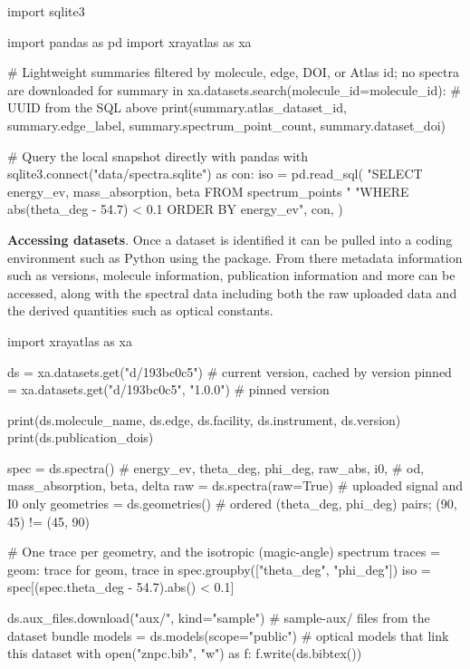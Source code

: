\begin{codeblock}
import sqlite3

import pandas as pd
import xrayatlas as xa

# Lightweight summaries filtered by molecule, edge, DOI, or Atlas id; no spectra are downloaded
for summary in xa.datasets.search(molecule_id=molecule_id):   # UUID from the SQL above
    print(summary.atlas_dataset_id, summary.edge_label,
          summary.spectrum_point_count, summary.dataset_doi)

# Query the local snapshot directly with pandas
with sqlite3.connect("data/spectra.sqlite") as con:
    iso = pd.read_sql(
        "SELECT energy_ev, mass_absorption, beta FROM spectrum_points "
        "WHERE abs(theta_deg - 54.7) < 0.1 ORDER BY energy_ev",
        con,
    )
\end{codeblock}

\textbf{Accessing datasets}. Once a dataset is identified it can be pulled into a coding environment such as Python using the  package. From there metadata information such as versions, molecule information, publication information and more can be accessed, along with the spectral data including both the raw uploaded data and the derived quantities such as optical constants.

\begin{codeblock}
import xrayatlas as xa

ds = xa.datasets.get("d/193bc0c5")               # current version, cached by version
pinned = xa.datasets.get("d/193bc0c5", "1.0.0")  # pinned version

print(ds.molecule_name, ds.edge, ds.facility, ds.instrument, ds.version)
print(ds.publication_dois)

spec = ds.spectra()           # energy_ev, theta_deg, phi_deg, raw_abs, i0,
                              # od, mass_absorption, beta, delta
raw = ds.spectra(raw=True)    # uploaded signal and I0 only
geometries = ds.geometries()  # ordered (theta_deg, phi_deg) pairs; (90, 45) != (45, 90)

# One trace per geometry, and the isotropic (magic-angle) spectrum
traces = {geom: trace for geom, trace in spec.groupby(["theta_deg", "phi_deg"])}
iso = spec[(spec.theta_deg - 54.7).abs() < 0.1]

ds.aux_files.download("aux/", kind="sample")     # sample-aux/ files from the dataset bundle
models = ds.models(scope="public")               # optical models that link this dataset
with open("znpc.bib", "w") as f:
    f.write(ds.bibtex())
\end{codeblock}

